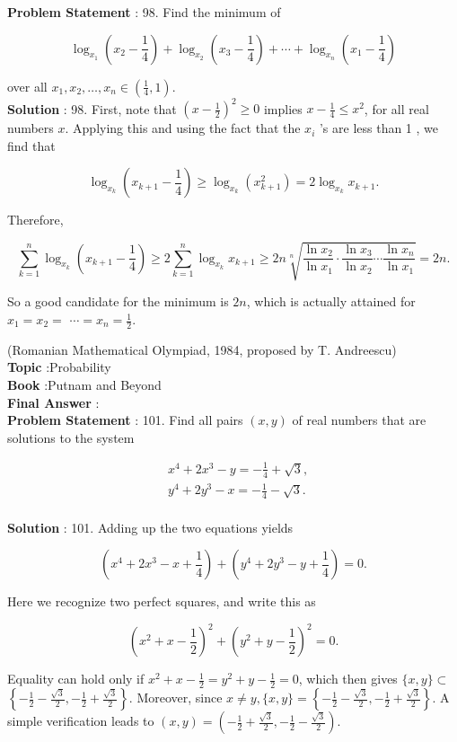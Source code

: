 \documentclass[10pt]{article}
\begin{document}
\textbf{Problem Statement} :
98. Find the minimum of

$$
\log _{x_{1}}\left(x_{2}-\frac{1}{4}\right)+\log _{x_{2}}\left(x_{3}-\frac{1}{4}\right)+\cdots+\log _{x_{n}}\left(x_{1}-\frac{1}{4}\right)
$$

over all $x_{1}, x_{2}, \ldots, x_{n} \in\left(\frac{1}{4}, 1\right)$. 
\\
\textbf{Solution} :
98. First, note that $\left(x-\frac{1}{2}\right)^{2} \geq 0$ implies $x-\frac{1}{4} \leq x^{2}$, for all real numbers $x$. Applying this and using the fact that the $x_{i}$ 's are less than 1 , we find that

$$
\log _{x_{k}}\left(x_{k+1}-\frac{1}{4}\right) \geq \log _{x_{k}}\left(x_{k+1}^{2}\right)=2 \log _{x_{k}} x_{k+1} .
$$

Therefore,

$$
\sum_{k=1}^{n} \log _{x_{k}}\left(x_{k+1}-\frac{1}{4}\right) \geq 2 \sum_{k=1}^{n} \log _{x_{k}} x_{k+1} \geq 2 n \sqrt[n]{\frac{\ln x_{2}}{\ln x_{1}} \cdot \frac{\ln x_{3}}{\ln x_{2}} \cdots \frac{\ln x_{n}}{\ln x_{1}}}=2 n .
$$

So a good candidate for the minimum is $2 n$, which is actually attained for $x_{1}=x_{2}=$ $\cdots=x_{n}=\frac{1}{2}$.

(Romanian Mathematical Olympiad, 1984, proposed by T. Andreescu)
\\
\textbf{Topic} :Probability\\
\textbf{Book} :Putnam and Beyond\\
\textbf{Final Answer} :\\


\textbf{Problem Statement} :
101. Find all pairs $(x, y)$ of real numbers that are solutions to the system

$$
\begin{aligned}
&x^{4}+2 x^{3}-y=-\frac{1}{4}+\sqrt{3}, \\
&y^{4}+2 y^{3}-x=-\frac{1}{4}-\sqrt{3} .
\end{aligned}
$$
\\
\textbf{Solution} :
101. Adding up the two equations yields

$$
\left(x^{4}+2 x^{3}-x+\frac{1}{4}\right)+\left(y^{4}+2 y^{3}-y+\frac{1}{4}\right)=0 .
$$

Here we recognize two perfect squares, and write this as

$$
\left(x^{2}+x-\frac{1}{2}\right)^{2}+\left(y^{2}+y-\frac{1}{2}\right)^{2}=0 .
$$

Equality can hold only if $x^{2}+x-\frac{1}{2}=y^{2}+y-\frac{1}{2}=0$, which then gives $\{x, y\} \subset$ $\left\{-\frac{1}{2}-\frac{\sqrt{3}}{2},-\frac{1}{2}+\frac{\sqrt{3}}{2}\right\}$. Moreover, since $x \neq y,\{x, y\}=\left\{-\frac{1}{2}-\frac{\sqrt{3}}{2},-\frac{1}{2}+\frac{\sqrt{3}}{2}\right\}$. A simple verification leads to $(x, y)=\left(-\frac{1}{2}+\frac{\sqrt{3}}{2},-\frac{1}{2}-\frac{\sqrt{3}}{2}\right)$.
\end{document}
